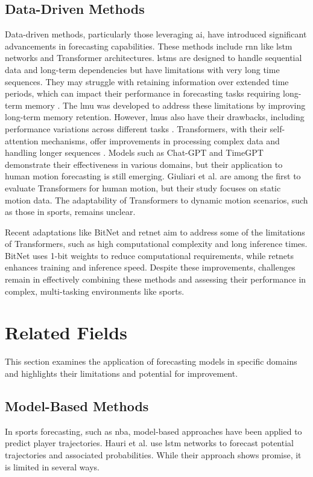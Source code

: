 \subsection{Data-Driven Methods}
\label{sec:data_driven_methods}
Data-driven methods, particularly those leveraging \gls{ai}, have introduced significant advancements in forecasting capabilities. These methods include \gls{rnn} like \gls{lstm} networks and Transformer architectures. \glspl{lstm} \cite{lstm} are designed to handle sequential data and long-term dependencies but have limitations with very long time sequences. They may struggle with retaining information over extended time periods, which can impact their performance in forecasting tasks requiring long-term memory \cite{lmu}. The \gls{lmu} \cite{lmu} was developed to address these limitations by improving long-term memory retention. However, \glspl{lmu} also have their drawbacks, including performance variations across different tasks \cite{gosalci}. Transformers, with their self-attention mechanisms, offer improvements in processing complex data and handling longer sequences \cite{transformer}. Models such as Chat-GPT \cite{gpt} and TimeGPT \cite{timegpt} demonstrate their effectiveness in various domains, but their application to human motion forecasting is still emerging. Giuliari et al. \cite{giuliari2020transformer} are among the first to evaluate Transformers for human motion, but their study focuses on static motion data. The adaptability of Transformers to dynamic motion scenarios, such as those in sports, remains unclear.

Recent adaptations like BitNet \cite{BitNet2023} and \gls{retnet} \cite{RetNet} aim to address some of the limitations of Transformers, such as high computational complexity and long inference times. BitNet uses 1-bit weights to reduce computational requirements, while \glspl{retnet} enhances training and inference speed. Despite these improvements, challenges remain in effectively combining these methods and assessing their performance in complex, multi-tasking environments like sports.

\section{Related Fields}
This section examines the application of forecasting models in specific domains and highlights their limitations and potential for improvement.

\subsection{Model-Based Methods}
\label{sec:related_subject}
In sports forecasting, such as \gls{nba}, model-based approaches have been applied to predict player trajectories. Hauri et al. \cite{MBT} use \gls{lstm} networks to forecast potential trajectories and associated probabilities. While their approach shows promise, it is limited in several ways.

